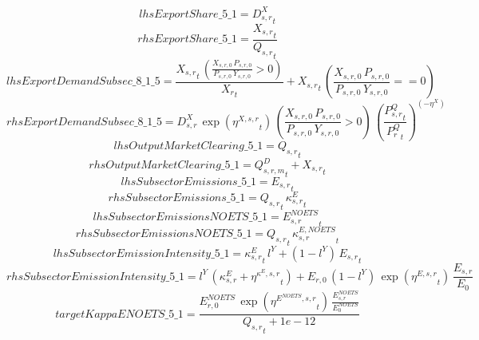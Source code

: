 \begin{dmath*}
lhsExportShare\_5\_1 = {{D^{X}_{s,r}}}_{t}
\end{dmath*}
\begin{dmath*}
rhsExportShare\_5\_1 = \frac{{{X_{s,r}}}_{t}}{{{Q_{s,r}}}_{t}}
\end{dmath*}
\begin{dmath*}
lhsExportDemandSubsec\_8\_1\_5 = \frac{{{X_{s,r}}}_{t}\, \left({\frac{X_{s,r,0} \, P_{s,r,0}}{P_{s,r,0} \, Y_{s,r,0}}}>0\right)}{{{X_r}}_{t}}+{{X_{s,r}}}_{t}\, \left({\frac{X_{s,r,0} \, P_{s,r,0}}{P_{s,r,0} \, Y_{s,r,0}}}==0\right)
\end{dmath*}
\begin{dmath*}
rhsExportDemandSubsec\_8\_1\_5 = {{D^{X}_{s,r}}}\, \exp\left({{\eta^{X,s,r}}}_{t}\right)\, \left({\frac{X_{s,r,0} \, P_{s,r,0}}{P_{s,r,0} \, Y_{s,r,0}}}>0\right)\, \left(\frac{{{P^Q_{s,r}}}_{t}}{{{P^Q_{r}}}_{t}}\right)^{\left(-{{\eta^{X}}}\right)}
\end{dmath*}
\begin{dmath*}
lhsOutputMarketClearing\_5\_1 = {{Q_{s,r}}}_{t}
\end{dmath*}
\begin{dmath*}
rhsOutputMarketClearing\_5\_1 = {{Q^D_{s,r,m}}}_{t}+{{X_{s,r}}}_{t}
\end{dmath*}
\begin{dmath*}
lhsSubsectorEmissions\_5\_1 = {{E_{s,r}}}_{t}
\end{dmath*}
\begin{dmath*}
rhsSubsectorEmissions\_5\_1 = {{Q_{s,r}}}_{t}\, {{\kappa^{E}_{s,r}}}_{t}
\end{dmath*}
\begin{dmath*}
lhsSubsectorEmissionsNOETS\_5\_1 = {{E^{NOETS}_{s,r}}}_{t}
\end{dmath*}
\begin{dmath*}
rhsSubsectorEmissionsNOETS\_5\_1 = {{Q_{s,r}}}_{t}\, {{\kappa^{E,NOETS}_{s,r}}}_{t}
\end{dmath*}
\begin{dmath*}
lhsSubsectorEmissionIntensity\_5\_1 = {{\kappa^{E}_{s,r}}}_{t}\, {{l^{Y}}}+\left(1-{{l^{Y}}}\right)\, {{E_{s,r}}}_{t}
\end{dmath*}
\begin{dmath*}
rhsSubsectorEmissionIntensity\_5\_1 = {{l^{Y}}}\, \left({{\kappa^{E}_{s,r}}}+{{\eta^{\kappa^{E},s,r}}}_{t}\right)+{{E_{r,0}}}\, \left(1-{{l^{Y}}}\right)\, \exp\left({{\eta^{E,s,r}}}_{t}\right)\, {{\frac{E_{s,r}}{E_0}}}
\end{dmath*}
\begin{dmath*}
targetKappaENOETS\_5\_1 = \frac{{{E^{NOETS}_{r,0}}}\, \exp\left({{\eta^{E^{NOETS},s,r}}}_{t}\right)\, {{\frac{E^{NOETS}_{s,r}}{E^{NOETS}_0}}}}{{{Q_{s,r}}}_{t}+1e-12}
\end{dmath*}
